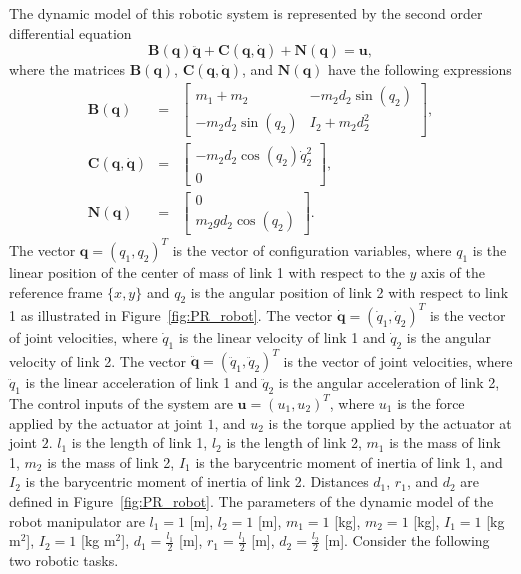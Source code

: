\documentclass[a4paper]{article}
\begin{document}
\noindent
The dynamic model of this robotic system is represented by the
second order differential equation 
\begin{equation*}
\mathbf{B}(\mathbf{q}) \ddot{\mathbf{q}}+ \mathbf{C}(\mathbf{q}, \dot{\mathbf{q}}) + \mathbf{N}(\mathbf{q}) = \mathbf{u},
\end{equation*}
where the matrices $\mathbf{B}(\mathbf{q})$, $\mathbf{C}(\mathbf{q}, \dot{\mathbf{q}})$, and $\mathbf{N}(\mathbf{q})$ have the following expressions
\begin{eqnarray*}
\mathbf{B}(\mathbf{q}) &=&
\begin{bmatrix}
m_1 + m_2 &-m_2 d_2 \sin ( q_2)\\
-m_2 d_2 \sin (q_2) & I_2 + m_2 d_2^2
\end{bmatrix},\\
\mathbf{C}(\mathbf{q}, \dot{\mathbf{q}}) 
&=& 
\begin{bmatrix} 
-m_2 d_2 \cos(q_2) \dot{q}_2^2\\
0
\end{bmatrix},\\
\mathbf{N}(\mathbf{q}) 
&=& 
\begin{bmatrix}
0\\
m_2 g d_2 \cos(q_2) 
\end{bmatrix}.
\end{eqnarray*}
The vector 
$
\mathbf{q} =
(
q_1, q_2
)^T
$ 
is the vector of configuration variables, where 
$q_1$ is the linear position of the center of mass of link 1 with respect to the $y$ axis of the reference frame $\{x, y\}$ and 
$q_2$ is the angular position of link 2 with respect to link 1 as illustrated in Figure~\ref{fig:PR_robot}. 
The
vector
$
\dot{\mathbf{q}} =
(\dot{q}_1,
\dot{q}_2)^T
$ 
is the vector of joint velocities, where 
$\dot{q}_1$ is the linear velocity of link 1 and
$\dot{q}_2$ is the angular velocity of link 2.
The vector
$
\ddot{\mathbf{q}} =
(\ddot{q}_1,
\ddot{q}_2)^T
$
is the vector of joint velocities, where 
$\ddot{q}_1$ is the linear acceleration of link 1 and
$\ddot{q}_2$ is the angular acceleration of link 2,
The control inputs of the system are
$
\mathbf{u} =
(u_1,
u_2)^T
$,
where $u_1$ is the force applied by the actuator at joint  $1$, and
$u_2$ is the torque applied by the actuator at joint  $2$. 
$l_1$ is the length of link 1,
$l_2$ is the length of link 2,
$m_1$ is the mass of link 1,  
$m_2$ is the mass of link 2,
$I_1$ is the barycentric moment of inertia of link 1, and
$I_2$ is the barycentric moment of inertia of link 2.
Distances $d_1$, $r_1$, and $d_2$ are defined in Figure~\ref{fig:PR_robot}.
The parameters of the dynamic model of the robot manipulator are 
$l_1 = 1$ [m],
$l_2 = 1$ [m],
$m_1 = 1$ [kg],
$m_2 = 1$ [kg],
$I_1 = 1$  [kg $\text{m}^2$],
$I_2 = 1$ [kg $\text{m}^2$],
$d_1 = \frac{l_1}{2}$ [m],
$r_1 = \frac{l_1}{2}$ [m],
$d_2 = \frac{l_2}{2}$ [m].
Consider the following two robotic tasks.
\end{document}
